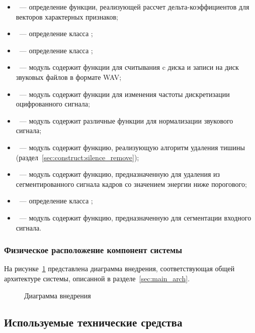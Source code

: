 \begin{itemize}
\item {}~--- определение функции, реализующей рассчет
дельта-коэффициентов для векторов характерных признаков;
\item {}~--- определение класса ;
\item {}~--- определение класса ;
\item {}~--- модуль содержит функции для считывания c диска и
записи на диск
звуковых файлов в формате WAV;
\item {}~--- модуль содержит функции для изменения частоты
дискретизации оцифрованного сигнала;
\item {}~--- модуль содержит различные функции для
нормализации звукового сигнала;
\item {}~--- модуль содержит функцию,
реализующую
алгоритм удаления тишины (раздел~\ref{sec:construct:silence_remove});
\item {}~--- модуль содержит функцию,
предназначенную для удаления из сегментированного сигнала кадров со значением
энергии ниже порогового;
\item {}~--- определение класса ;
\item {}~--- модуль содержит функцию, предназначенную
для сегментации входного сигнала.
\end{itemize}

\subsubsection*{Физическое расположение компонент системы}

На рисунке~\ref{fig:deployment} представлена диаграмма внедрения,
соответствующая общей архитектуре системы, описанной в
разделе~\ref{sec:main_arch}.

\begin{figure}[htp!]
    \caption{Диаграмма внедрения}
    \label{fig:deployment}
\end{figure}


\subsection{Используемые технические средства}
\label{sec:soft_description:tech}

